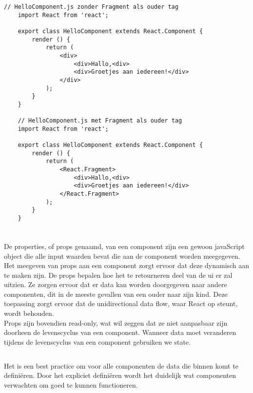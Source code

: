 \newpage
\begin{lstlisting}[caption=Gebruik van de Fragment tag, label={fig:fragments}]
    // HelloComponent.js zonder Fragment als ouder tag
    import React from 'react';
    
    export class HelloComponent extends React.Component {
        render () {
            return (
                <div>
                    <div>Hallo,<div>
                    <div>Groetjes aan iedereen!</div>
                </div>
            );
        }
    }
    
    // HelloComponent.js met Fragment als ouder tag
    import React from 'react';
    
    export class HelloComponent extends React.Component {
        render () {
            return (
                <React.Fragment>
                    <div>Hallo,<div>
                    <div>Groetjes aan iedereen!</div>
                </React.Fragment>
            );
        }
    }
\end{lstlisting}

\section{}
\label{sec:properties}

De properties, of props genaamd, van een component zijn een gewoon javaScript object die alle input waarden bevat die aan de component worden meegegeven. Het meegeven van props aan een component zorgt ervoor dat deze dynamisch aan te maken zijn. De props bepalen hoe het te retourneren deel van de \gls{ui} er zal uitzien. Ze zorgen ervoor dat er data kan worden doorgegeven naar andere componenten, dit in de meeste gevallen van een ouder naar zijn kind. Deze toepassing zorgt ervoor dat de unidirectional data flow, waar React op steunt, wordt behouden.\\
Props zijn bovendien read-only, wat wil zeggen dat ze niet aanpasbaar zijn doorheen de levenscyclus van een component. Wanneer data moet veranderen tijdens de levenscyclus van een component gebruiken we state.

\subsection{}
\label{sec:propTypes}

Het is een best practice om voor alle componenten de data die binnen komt te definiëren. Door het expliciet definiëren wordt het duidelijk wat componenten verwachten om goed te kunnen functioneren.

